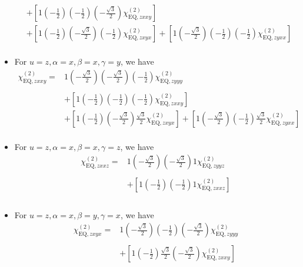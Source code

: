 \documentclass[UTF8,10pt,a4paper]{article}
\begin{document}
\begin{itemize}
\begin{align}
\nonumber&\\
\nonumber&+\left[1\left(-\frac{1}{2}\right)\left(-\frac{1}{2}\right)\left(-\frac{\sqrt{3}}{2}\right)\chi_{\text{EQ},zxxy}^{(2)}\right]\\
\nonumber&+\left[1\left(-\frac{1}{2}\right)\left(-\frac{\sqrt{3}}{2}\right)\left(-\frac{1}{2}\right)\chi_{\text{EQ},zxyx}^{(2)}\right]+\left[1\left(-\frac{\sqrt{3}}{2}\right)\left(-\frac{1}{2}\right)\left(-\frac{1}{2}\right)\chi_{\text{EQ},zyxx}^{(2)}\right]\\
&
\end{align}\normalsize
\item For $u=z,\alpha=x,\beta=x,\gamma=y$, we have
\footnotesize\begin{align}
\nonumber\chi_{\text{EQ},zxxy}^{(2)}=&1\left(-\frac{\sqrt{3}}{2}\right)\left(-\frac{\sqrt{3}}{2}\right)\left(-\frac{1}{2}\right)\chi_{\text{EQ},zyyy}^{(2)}\\
\nonumber&\\
\nonumber&+\left[1\left(-\frac{1}{2}\right)\left(-\frac{1}{2}\right)\left(-\frac{1}{2}\right)\chi_{\text{EQ},zxxy}^{(2)}\right]\\
\nonumber&+\left[1\left(-\frac{1}{2}\right)\left(-\frac{\sqrt{3}}{2}\right)\frac{\sqrt{3}}{2}\chi_{\text{EQ},zxyx}^{(2)}\right]+\left[1\left(-\frac{\sqrt{3}}{2}\right)\left(-\frac{1}{2}\right)\frac{\sqrt{3}}{2}\chi_{\text{EQ},zyxx}^{(2)}\right]\\
&
\end{align}\normalsize
\item For $u=z,\alpha=x,\beta=x,\gamma=z$, we have
\footnotesize\begin{align}
\nonumber\chi_{\text{EQ},zxxz}^{(2)}=&1\left(-\frac{\sqrt{3}}{2}\right)\left(-\frac{\sqrt{3}}{2}\right)1\chi_{\text{EQ},zyyz}^{(2)}\\
\nonumber&\\
\nonumber&+\left[1\left(-\frac{1}{2}\right)\left(-\frac{1}{2}\right)1\chi_{\text{EQ},zxxz}^{(2)}\right]\\
\nonumber&\\
&
\end{align}\normalsize
\item For $u=z,\alpha=x,\beta=y,\gamma=x$, we have
\footnotesize\begin{align}
\nonumber\chi_{\text{EQ},zxyx}^{(2)}=&1\left(-\frac{\sqrt{3}}{2}\right)\left(-\frac{1}{2}\right)\left(-\frac{\sqrt{3}}{2}\right)\chi_{\text{EQ},zyyy}^{(2)}\\
\nonumber&\\
\nonumber&+\left[1\left(-\frac{1}{2}\right)\frac{\sqrt{3}}{2}\left(-\frac{\sqrt{3}}{2}\right)\chi_{\text{EQ},zxxy}^{(2)}\right]\\

\end{align}
\end{itemize}
\end{document}
